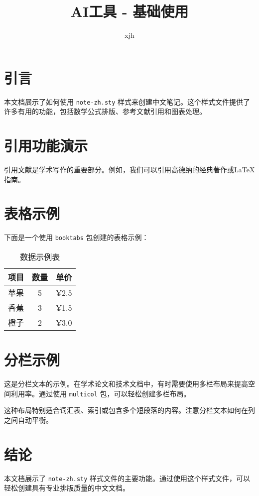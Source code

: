 \documentclass{article}
\title{AI工具 - 基础使用}
\author{xjh}
\begin{document}
\maketitle

\section{引言}
本文档展示了如何使用 \texttt{note-zh.sty} 样式来创建中文笔记。这个样式文件提供了许多有用的功能，包括数学公式排版、参考文献引用和图表处理。

\section{引用功能演示}
引用文献是学术写作的重要部分。例如，我们可以引用高德纳的经典著作\cite{knuth1984texbook}或LaTeX指南\cite{lamport1994latex}。

\section{表格示例}
下面是一个使用 \texttt{booktabs} 包创建的表格示例：

\begin{table}[htbp]
  \centering
  \caption{数据示例表}
  \begin{tabular}{lcc}
    \toprule
    项目 & 数量 & 单价 \\
    \midrule
    苹果 & 5 & ¥2.5 \\
    香蕉 & 3 & ¥1.5 \\
    橙子 & 2 & ¥3.0 \\
    \bottomrule
  \end{tabular}
\end{table}

\section{分栏示例}
\begin{multicols}{2}
  这是分栏文本的示例。在学术论文和技术文档中，有时需要使用多栏布局来提高空间利用率。通过使用 \texttt{multicol} 包，可以轻松创建多栏布局。

  这种布局特别适合词汇表、索引或包含多个短段落的内容。注意分栏文本如何在列之间自动平衡。
\end{multicols}

\section{结论}
本文档展示了 \texttt{note-zh.sty} 样式文件的主要功能。通过使用这个样式文件，可以轻松创建具有专业排版质量的中文文档。



\end{document}
